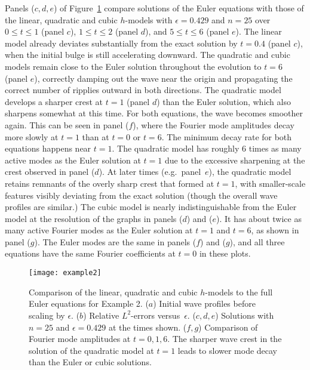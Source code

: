 \documentclass[11pt]{article}
\theoremstyle{plain}
\theoremstyle{definition}
\theoremstyle{definition}
\newcommand{\eps}{\epsilon}
\begin{document}
Panels ($c,d,e$) of Figure~\ref{fig:ex2} compare solutions of the
Euler equations with those of the linear, quadratic and cubic
$h$-models with $\eps=0.429$ and $n=25$ over $0\le t\le 1$ (panel
  $c$), $1\le t\le 2$ (panel $d$), and $5\le t\le 6$ (panel $e$).  The
linear model already deviates substantially from the exact solution by
$t=0.4$ (panel $c$), when the initial bulge is still accelerating
downward.  The quadratic and cubic models remain close to the Euler
solution throughout the evolution to $t=6$ (panel $e$), correctly
damping out the wave near the origin and propagating the correct
number of ripplies outward in both directions. The quadratic model
develops a sharper crest at $t=1$ (panel $d$) than the Euler solution,
which also sharpens somewhat at this time. For both equations, the
wave becomes smoother again.  This can be seen in panel ($f$), where
the Fourier mode amplitudes decay more slowly at $t=1$ than at $t=0$
or $t=6$. The minimum decay rate for both equations happens near
$t=1$.  The quadratic model has roughly 6 times as many active modes
as the Euler solution at $t=1$ due to the excessive sharpening at the
crest observed in panel ($d$). At later times (e.g.~panel~$e$), the
quadratic model retains remnants of the overly sharp crest that formed
at $t=1$, with smaller-scale features visibly deviating from the exact
solution (though the overall wave profiles are similar.) The cubic
model is nearly indistinguishable from the Euler model at the
resolution of the graphs in panels ($d$) and ($e$).  It has about
twice as many active Fourier modes as the Euler solution at $t=1$ and
$t=6$, as shown in panel ($g$).  The Euler modes are the same in
panels ($f$) and ($g$), and all three equations have the same Fourier
coefficients at $t=0$ in these plots.

\begin{figure}[p]
  \begin{center}
\texttt{[image: example2]}
\caption{\label{fig:ex2} Comparison of the linear, quadratic and cubic
  $h$-models to the full Euler equations for Example 2.  ($a$) Initial
  wave profiles before scaling by $\eps$. ($b$) Relative $L^2$-errors
  versus~$\eps$. ($c,d,e$) Solutions with $n=25$ and $\eps=0.429$ at
  the times shown. ($f,g$) Comparison of Fourier mode amplitudes at
  $t=0,1,6$. The sharper wave crest in the solution of the quadratic model
  at $t=1$ leads to slower mode decay than the Euler or cubic solutions.}
\end{center}
\end{figure}
\end{document}
